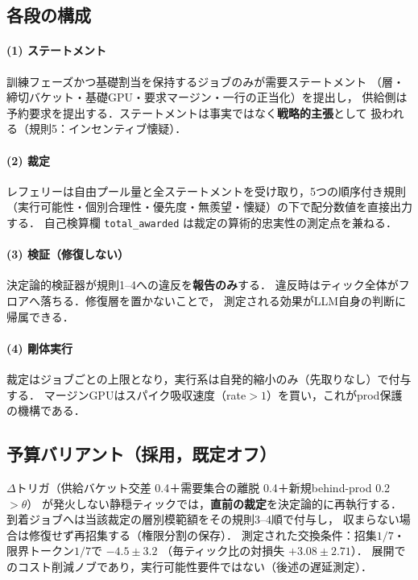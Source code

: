 \subsection{各段の構成}
\paragraph{(1) ステートメント}
訓練フェーズかつ基礎割当を保持するジョブのみが需要ステートメント
（層・締切バケット・基礎GPU・要求マージン・一行の正当化）を提出し，
供給側は予約要求を提出する．ステートメントは事実ではなく\textbf{戦略的主張}として
扱われる（規則5：インセンティブ懐疑）．

\paragraph{(2) 裁定}
レフェリーは自由プール量と全ステートメントを受け取り，5つの順序付き規則
（実行可能性・個別合理性・優先度・無羨望・懐疑）の下で配分数値を直接出力する．
自己検算欄 \texttt{total\_awarded} は裁定の算術的忠実性の測定点を兼ねる．

\paragraph{(3) 検証（修復しない）}
決定論的検証器が規則1--4への違反を\textbf{報告のみ}する．
違反時はティック全体がフロアへ落ちる．修復層を置かないことで，
測定される効果がLLM自身の判断に帰属できる．

\paragraph{(4) 剛体実行}
裁定はジョブごとの上限となり，実行系は自発的縮小のみ（先取りなし）で付与する．
マージンGPUはスパイク吸収速度（rate$>1$）を買い，これがprod保護の機構である．

\subsection{予算バリアント（採用，既定オフ）}
$\Delta$トリガ（供給バケット交差 0.4＋需要集合の離脱 0.4＋新規behind-prod 0.2 $>\theta$）
が発火しない静穏ティックでは，\textbf{直前の裁定}を決定論的に再執行する．
到着ジョブへは当該裁定の層別模範額をその規則3--4順で付与し，
収まらない場合は修復せず再招集する（権限分割の保存）．
測定された交換条件：招集$1/7$・限界トークン$1/7$で $-4.5\pm3.2$\sig
（毎ティック比の対損失 $+3.08\pm2.71$）．
展開でのコスト削減ノブであり，実行可能性要件ではない（後述の遅延測定）．

